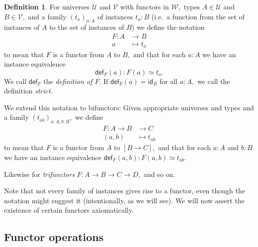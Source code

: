 \documentclass[a4paper]{article}
\theoremstyle{definition}
\newtheorem{definition}{Definition}[section]
\theoremstyle{remark}
\newcommand{\defn}{\emph}
\renewcommand{\equiv}{\simeq}
\newcommand{\U}{\mathcal{U}}
\newcommand{\V}{\mathcal{V}}
\newcommand{\W}{\mathcal{W}}
\newcommand{\nm}{\mathsf}
\newcommand{\id}{\nm{id}}
\newcommand{\fndef}[1]{\nm{def}_{#1}}
\begin{document}
\begin{definition}
  For universes $\U$ and $\V$ with functors in $\W,$ types $A \in \U$ and $B \in \V,$
  and a family $(t_a)_{a : A}$ of instances $t_a : B$ (i.e.\ a function from the set of
  instances of $A$ to the set of instances of $B$) we define the notation
  \begin{align*}
    F : A &\to     B\\
        a &\mapsto t_a
  \end{align*}
  to mean that $F$ is a functor from $A$ to $B,$ and that for each $a : A$ we have an instance
  equivalence
  \[\fndef{F}(a) : F(a) \equiv t_a.\]
  We call $\fndef{F}$ the \defn{definition of $F$}. If $\fndef{F}(a) = \id_B$ for all $a : A,$
  we call the definition \defn{strict}.

  We extend this notation to bifunctors: Given appropriate universes and types and a
  family $(t_{ab})_{a : A, b : B},$ we define
  \begin{align*}
    F : A \to B &\to     C\\
        (a,b)   &\mapsto t_{ab}
  \end{align*}
  to mean that $F$ is a functor from $A$ to $[B \to C],$ and that for each $a : A$ and $b : B$ we
  have an instance equivalence $\fndef{F}(a,b) : F(a,b) \equiv t_{ab}.$

  Likewise for \defn{trifunctors} $F : A \to B \to C \to D,$ and so on.
\end{definition}

Note that not every family of instances gives rise to a functor, even though the notation might
suggest it (intentionally, as we will see). We will now assert the existence of certain functors
axiomatically.

\subsection{Functor operations}
\label{sec:funop}
\end{document}
